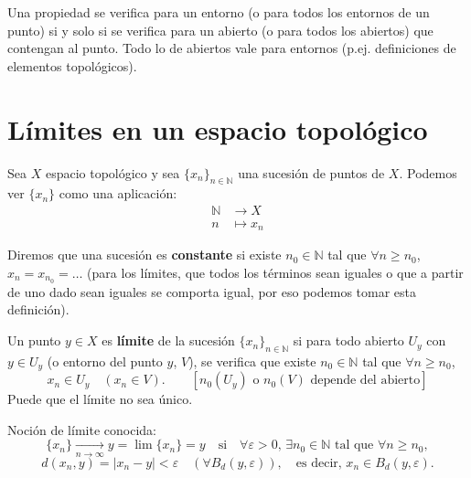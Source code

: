 \begin{obs}
    Una propiedad se verifica para un entorno (o para todos los entornos de un punto) si y solo si se verifica para un abierto (o para todos los abiertos) que contengan al punto.  
    Todo lo de abiertos vale para entornos (p.ej. definiciones de elementos topológicos).
\end{obs}

\section{Límites en un espacio topológico}

Sea \(X\) espacio topológico y sea \(\{x_n\}_{n \in \mathbb{N}}\) una sucesión de puntos de \(X\). Podemos ver \(\{x_n\}\) como una aplicación:
\[
    \begin{aligned}
        \mathbb{N} &\longrightarrow X \\
        n &\longmapsto x_n
    \end{aligned}
\]

Diremos que una sucesión es \textbf{constante} si existe \(n_0 \in \mathbb{N}\) tal que \(\forall n \ge n_0\), \(x_n = x_{n_0} = \ldots\) (para los límites, que todos los términos sean iguales o que a partir de uno dado sean iguales se comporta igual, por eso podemos tomar esta definición).

\begin{defi}
    Un punto \(y \in X\) es \textbf{límite} de la sucesión \(\{x_n\}_{n \in \mathbb{N}}\) si para todo abierto \(U_y\) con \(y \in U_y\) (o entorno del punto \(y\), \(V\)), se verifica que existe \(n_0 \in \mathbb{N}\) tal que \(\forall n \ge n_0\),
    \[
        x_n \in U_y \quad (x_n \in V). \qquad [n_0(U_y) \text{ o } n_0(V) \text{ depende del abierto}]
    \]
    Puede que el límite no sea único.
\end{defi}

\begin{ejem}[\((\mathbb{R}, \mc T_d)\)]
    Noción de límite conocida:
    \[
        \{x_n\} \xrightarrow[n \to \infty]{} y = \lim \{x_n\} = y \quad \text{si} \quad \forall \varepsilon > 0, \, \exists n_0 \in \mathbb{N} \text{ tal que } \forall n \ge n_0,
    \]
    \[
        d(x_n, y) = |x_n - y| < \varepsilon \quad (\forall B_d(y,\varepsilon)), \quad \text{es decir, } x_n \in B_d(y,\varepsilon).
    \]
\end{ejem}

